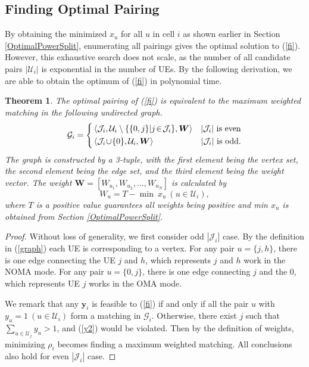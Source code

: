 \documentclass[10pt,journal,final,finalsubmission,twocolumn]{IEEEtran}
\newtheorem{theorem}{Theorem}
\begin{document}
 
\subsection{Finding Optimal Pairing}

By obtaining the minimized $x_u$ for all $u$ in cell $i$ as shown earlier in Section \ref{OptimalPowerSplit}, enumerating all pairings gives the optimal solution to (\ref{fi}). However, this exhaustive search does not scale, as the number of all candidate pairs $|\mathcal{U}_i |$ is exponential in the number of UEs. By the following derivation, we are able to obtain the optimum of (\ref{fi}) in polynomial time.

\begin{theorem}
The optimal pairing of (\ref{fi}) is equivalent to the maximum weighted matching in the following undirected graph.
\begin{equation}\label{graph}
\mathcal{G}_i=\left\{
\begin{aligned}
&\left \langle\mathcal{J}_i, \mathcal{U}_i \setminus \{\{0,j\}|j\!\in\!\mathcal{J}_i \}, \boldsymbol{W}\right \rangle&|\mathcal{J}_i|{\rm\ is\ even}\\
&\left \langle\mathcal{J}_i\!\cup\!\{0 \}, \mathcal{U}_i, \boldsymbol{W}\right \rangle&|\mathcal{J}_i|{\rm\ is\ odd}.\end{aligned}
\right.
\end{equation}
The graph is constructed by a 3-tuple, with the first element being the vertex set, the second element being the edge set, and the third element being the weight vector. The weight $\boldsymbol{W} = [W_{u_1},W_{u_2},...,W_{u_N}]$ is calculated by 
\begin{equation}
W_u = T - {\min\ x_u}\ (u\in \mathcal{U}_i),
\end{equation}
where $T$ is a positive value guarantees all weights being positive and min $ x_u$ is obtained from Section \ref{OptimalPowerSplit}.
\end{theorem}
\begin{proof}
Without loss of generality, we first consider odd $|\mathcal{J}_i|$ case. By the definition in (\ref{graph}) each UE is corresponding to a vertex. For any pair $u = \{j,h\}$, there is one edge connecting the UE $j$ and $h$, which represents $j$ and $h$ work in the NOMA mode. For any pair $u = \{0,j\}$, there is one edge connecting $j$ and the $0$, which represents UE $j$ works in the OMA mode. 

We remark that any $\boldsymbol{y}_i$ is feasible to (\ref{fi}) if and only if all the pair $u$ with $y_u=1\ (u\in \mathcal{U}_i)$ form a matching in $\mathcal{G}_i$. Otherwise, there exist $j$ such that $\sum_{u\in \mathcal{U}_j}y_u>1$, and (\ref{y2}) would be violated. Then by the definition of weights, minimizing $\rho_i$ becomes finding a maximum weighted matching. All conclusions also hold for even $|\mathcal{J}_i|$ case.
\end{proof}
\end{document}

